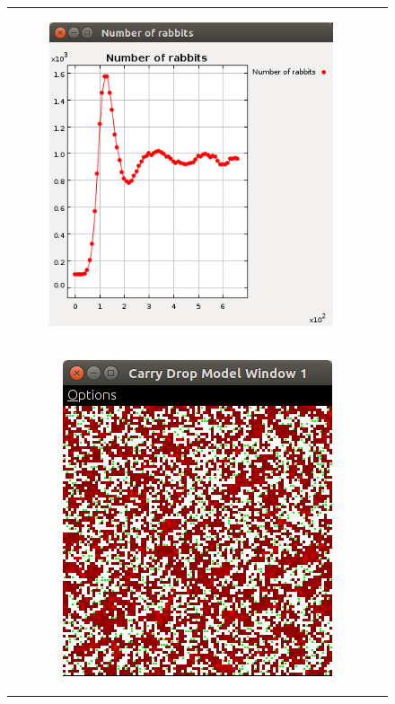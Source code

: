 \documentclass[11pt]{article}
\begin{document}
\begin{figure}
\begin{adjustbox}{width=\textwidth,center}
\begin{tabular}{c c}
\begin{subfigure}[b]{\textwidth}
        \includegraphics[width=\textwidth]{experiment/1/Rabbits.png}
        \caption{\label{img:rabbits1} }
    \end{subfigure}\\
    \multicolumn{2}{c}{\begin{subfigure}[b]{\textwidth}
        \includegraphics[width=\textwidth]{experiment/1/Space.png}
        \caption{\label{img:space1}}
    \end{subfigure}}
   

\end{tabular}
\end{adjustbox}
\end{figure}
\end{document}
